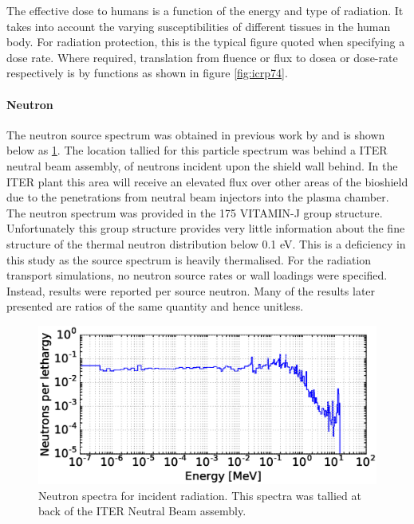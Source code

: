 The effective dose to humans is a function of the energy and type of radiation. It takes into account the varying susceptibilities of different tissues in the human body. For radiation protection, this is the typical figure quoted when specifying a dose rate. Where required, translation from fluence or flux to dosea or dose-rate respectively is by functions as shown in figure \ref{fig:icrp74}.

\paragraph{Neutron}
The neutron source spectrum was obtained in previous work by \citeauthor{Jakhar16} and is shown below as \ref{fig:src_spectra}. The location tallied for this particle spectrum was behind a ITER neutral beam assembly, of neutrons incident upon the shield wall behind. In the ITER plant this area will receive an elevated flux over other areas of the bioshield due to the penetrations from neutral beam injectors into the plasma chamber. The neutron spectrum was provided in the 175 VITAMIN-J group structure. Unfortunately this group structure provides very little information about the fine structure of the thermal neutron distribution below 0.1 eV. This is a deficiency in this study as the source spectrum is heavily thermalised. For the radiation transport simulations, no neutron source rates or wall loadings were specified. Instead, results were reported per source neutron. Many of the results later presented are ratios of the same quantity and hence unitless. 

\begin{figure}[H]
  \includegraphics[width=\textwidth]{src_spectra}
  \caption{Neutron spectra for incident radiation. This spectra was tallied at back of the ITER Neutral Beam assembly.}
  \label{fig:src_spectra}
\end{figure}

